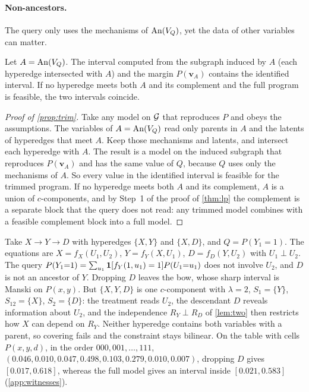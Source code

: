 \paragraph{Non-ancestors.}
The query only uses the mechanisms of $\operatorname{An}(V_Q)$, yet the data of other
variables can matter.

\begin{proposition}
\label{prop:trim}
Let $A=\operatorname{An}(V_Q)$. The interval computed from the subgraph induced by $A$
(each hyperedge intersected with $A$) and the margin $P(\mathbf{v}_A)$
contains the identified interval. If no hyperedge meets both $A$ and its
complement and the full program is feasible, the two intervals coincide.
\end{proposition}

\begin{proof}[Proof of \cref{prop:trim}]
Take any model on $\mathcal{G}$ that reproduces $P$ and obeys the assumptions. The variables of
$A=\operatorname{An}(V_Q)$ read only parents in $A$ and the latents of hyperedges that meet
$A$. Keep those mechanisms and latents, and intersect each hyperedge with
$A$. The result is a model on the induced subgraph that reproduces
$P(\mathbf{v}_A)$ and has the same value of $Q$, because $Q$ uses only the
mechanisms of $A$. So every value in the identified interval is feasible for
the trimmed program. If no hyperedge meets both $A$ and its complement, $A$ is
a union of $c$-components, and by Step~1 of the proof of \cref{thm:lp} the
complement is a separate block that the query does not read: any trimmed model
combines with a feasible complement block into a full model.
\end{proof}

\begin{example}
\label{ex:desc}
Take $X\to Y\to D$ with hyperedges $\{X,Y\}$ and $\{X,D\}$, and
$Q=P(Y_1{=}1)$. The equations are $X=f_X(U_1,U_2)$, $Y=f_Y(X,U_1)$,
$D=f_D(Y,U_2)$ with $U_1\perp U_2$. The query
$P(Y_1{=}1)=\sum_{u_1}\mathbf{1}[f_Y(1,u_1)=1]P(U_1{=}u_1)$ does not involve $U_2$,
and $D$ is not an ancestor of $Y$. Dropping $D$ leaves the bow, whose sharp
interval is Manski on $P(x,y)$. But $\{X,Y,D\}$ is one $c$-component with
$\lambda=2$, $S_1=\{Y\}$, $S_{12}=\{X\}$, $S_2=\{D\}$: the treatment reads
$U_2$, the descendant $D$ reveals information about $U_2$, and the
independence $R_Y\perp R_D$ of \cref{lem:two} then restricts how $X$ can
depend on $R_Y$. Neither hyperedge contains both variables with a parent, so covering fails and the
constraint stays bilinear. On the table with cells
$P(x,y,d)$, in the order $000,001,\ldots,111$,
$(0.046,0.010,0.047,0.498,0.103,0.279,0.010,0.007)$, dropping $D$ gives
$[0.017,0.618]$, whereas the full model gives an interval inside
$[0.021,0.583]$ (\cref{app:witnesses}).
\end{example}

